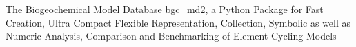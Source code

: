 The Biogeochemical Model Database bgc_md2, a Python Package for Fast Creation, Ultra Compact Flexible Representation, Collection, Symbolic as well as Numeric Analysis, Comparison and Benchmarking of Element Cycling Models 
